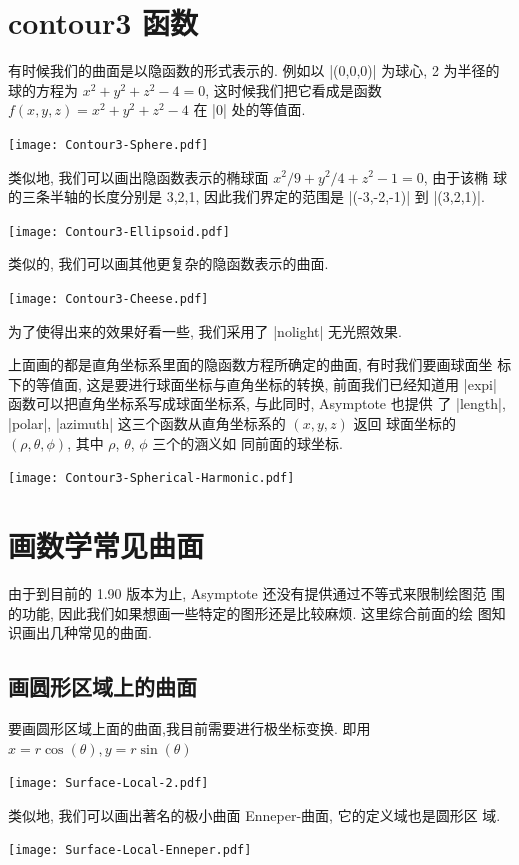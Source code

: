 \documentclass{ctexbook}
\begin{document}
\section{contour3 函数}
有时候我们的曲面是以隐函数的形式表示的. 例如以 |(0,0,0)| 为球心, 2 为半径的球的方程为
$x^2+y^2+z^2-4=0$, 这时候我们把它看成是函数
$f(x,y,z)=x^{2}+y^{2}+z^{2}-4$ 在 |0| 处的等值面.
\begin{center}\texttt{[image: Contour3-Sphere.pdf]}\end{center}%

类似地, 我们可以画出隐函数表示的椭球面 $x^2/9+y^2/4+z^2-1=0$, 由于该椭
球的三条半轴的长度分别是 3,2,1, 因此我们界定的范围是 |(-3,-2,-1)| 到
|(3,2,1)|.
\begin{center}\texttt{[image: Contour3-Ellipsoid.pdf]}\end{center}%

类似的, 我们可以画其他更复杂的隐函数表示的曲面.
\begin{center}\texttt{[image: Contour3-Cheese.pdf]}\end{center}%

为了使得出来的效果好看一些, 我们采用了 |nolight| 无光照效果.

上面画的都是直角坐标系里面的隐函数方程所确定的曲面, 有时我们要画球面坐
标下的等值面, 这是要进行球面坐标与直角坐标的转换, 前面我们已经知道用
|expi| 函数可以把直角坐标系写成球面坐标系, 与此同时, Asymptote 也提供
了 |length|, |polar|, |azimuth| 这三个函数从直角坐标系的 $(x,y,z)$ 返回
球面坐标的 $(\rho,\theta,\phi)$, 其中 $\rho$, $\theta$, $\phi$ 三个的涵义如
同前面的球坐标.
\begin{center}\texttt{[image: Contour3-Spherical-Harmonic.pdf]}\end{center}%


\section{画数学常见曲面}
由于到目前的 1.90 版本为止, Asymptote 还没有提供通过不等式来限制绘图范
围的功能, 因此我们如果想画一些特定的图形还是比较麻烦. 这里综合前面的绘
图知识画出几种常见的曲面.
\subsection{画圆形区域上的曲面}
要画圆形区域上面的曲面,我目前需要进行极坐标变换. 即用
$x=r\cos(\theta),y=r\sin(\theta)$
\begin{center}\texttt{[image: Surface-Local-2.pdf]}\end{center}%

类似地, 我们可以画出著名的极小曲面 Enneper-曲面, 它的定义域也是圆形区
域.
\begin{center}\texttt{[image: Surface-Local-Enneper.pdf]}\end{center}%

\end{document}
